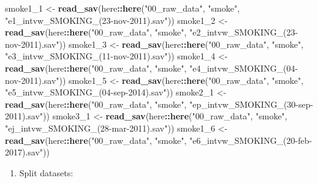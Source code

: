 \documentclass[]{book}
\newenvironment{Shaded}{\begin{snugshade}}{\end{snugshade}}
\newcommand{\DecValTok}[1]{\textcolor[rgb]{0.00,0.00,0.81}{#1}}
\newcommand{\KeywordTok}[1]{\textcolor[rgb]{0.13,0.29,0.53}{\textbf{#1}}}
\newcommand{\NormalTok}[1]{#1}
\newcommand{\OperatorTok}[1]{\textcolor[rgb]{0.81,0.36,0.00}{\textbf{#1}}}
\newcommand{\StringTok}[1]{\textcolor[rgb]{0.31,0.60,0.02}{#1}}
\providecommand{\tightlist}{%
  \setlength{\itemsep}{0pt}\setlength{\parskip}{0pt}}
\begin{document}
\begin{Shaded}
\begin{Highlighting}[]
\NormalTok{smoke1_}\DecValTok{1}\NormalTok{ <-}\StringTok{ }\KeywordTok{read_sav}\NormalTok{(here}\OperatorTok{::}\KeywordTok{here}\NormalTok{(}\StringTok{"00_raw_data"}\NormalTok{, }\StringTok{"smoke"}\NormalTok{, }\StringTok{"e1_intvw_SMOKING_(23-nov-2011).sav"}\NormalTok{))}
\NormalTok{smoke1_}\DecValTok{2}\NormalTok{ <-}\StringTok{ }\KeywordTok{read_sav}\NormalTok{(here}\OperatorTok{::}\KeywordTok{here}\NormalTok{(}\StringTok{"00_raw_data"}\NormalTok{, }\StringTok{"smoke"}\NormalTok{, }\StringTok{"e2_intvw_SMOKING_(23-nov-2011).sav"}\NormalTok{))}
\NormalTok{smoke1_}\DecValTok{3}\NormalTok{ <-}\StringTok{ }\KeywordTok{read_sav}\NormalTok{(here}\OperatorTok{::}\KeywordTok{here}\NormalTok{(}\StringTok{"00_raw_data"}\NormalTok{, }\StringTok{"smoke"}\NormalTok{, }\StringTok{"e3_intvw_SMOKING_(11-nov-2011).sav"}\NormalTok{))}
\NormalTok{smoke1_}\DecValTok{4}\NormalTok{ <-}\StringTok{ }\KeywordTok{read_sav}\NormalTok{(here}\OperatorTok{::}\KeywordTok{here}\NormalTok{(}\StringTok{"00_raw_data"}\NormalTok{, }\StringTok{"smoke"}\NormalTok{, }\StringTok{"e4_intvw_SMOKING_(04-nov-2011).sav"}\NormalTok{))}
\NormalTok{smoke1_}\DecValTok{5}\NormalTok{ <-}\StringTok{ }\KeywordTok{read_sav}\NormalTok{(here}\OperatorTok{::}\KeywordTok{here}\NormalTok{(}\StringTok{"00_raw_data"}\NormalTok{, }\StringTok{"smoke"}\NormalTok{, }\StringTok{"e5_intvw_SMOKING_(04-sep-2014).sav"}\NormalTok{))}
\NormalTok{smoke2_}\DecValTok{1}\NormalTok{ <-}\StringTok{ }\KeywordTok{read_sav}\NormalTok{(here}\OperatorTok{::}\KeywordTok{here}\NormalTok{(}\StringTok{"00_raw_data"}\NormalTok{, }\StringTok{"smoke"}\NormalTok{, }\StringTok{"ep_intvw_SMOKING_(30-sep-2011).sav"}\NormalTok{))}
\NormalTok{smoke3_}\DecValTok{1}\NormalTok{ <-}\StringTok{ }\KeywordTok{read_sav}\NormalTok{(here}\OperatorTok{::}\KeywordTok{here}\NormalTok{(}\StringTok{"00_raw_data"}\NormalTok{, }\StringTok{"smoke"}\NormalTok{, }\StringTok{"ej_intvw_SMOKING_(28-mar-2011).sav"}\NormalTok{))}
\NormalTok{smoke1_}\DecValTok{6}\NormalTok{ <-}\StringTok{ }\KeywordTok{read_sav}\NormalTok{(here}\OperatorTok{::}\KeywordTok{here}\NormalTok{(}\StringTok{"00_raw_data"}\NormalTok{, }\StringTok{"smoke"}\NormalTok{, }\StringTok{"e6_intvw_SMOKING_(20-feb-2017).sav"}\NormalTok{))}
\end{Highlighting}
\end{Shaded}

\begin{enumerate}
\def\labelenumi{\arabic{enumi}.}
\setcounter{enumi}{1}
\tightlist
\item
  Split datasets:
\end{enumerate}
\end{document}
